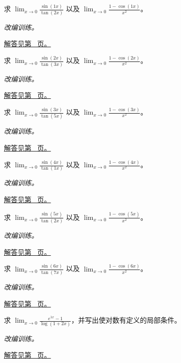 \documentclass[12pt,fontset=fandol]{ctexart}
\begin{document}
\begin{example}[三角函数的局部比较]\label{ex:c3q8}
求 $\displaystyle\lim_{x\to0}\frac{\sin(1x)}{\tan(2x)}$ 以及 $\displaystyle\lim_{x\to0}\frac{1-\cos(1x)}{x^2}$。
\par\textit{改编训练。}\par\hyperref[ans:c3q8]{解答见第~\pageref{ans:c3q8} 页。}
\end{example}
\begin{example}[三角函数的局部比较]\label{ex:c3q9}
求 $\displaystyle\lim_{x\to0}\frac{\sin(2x)}{\tan(3x)}$ 以及 $\displaystyle\lim_{x\to0}\frac{1-\cos(2x)}{x^2}$。
\par\textit{改编训练。}\par\hyperref[ans:c3q9]{解答见第~\pageref{ans:c3q9} 页。}
\end{example}
\begin{example}[三角函数的局部比较]\label{ex:c3q10}
求 $\displaystyle\lim_{x\to0}\frac{\sin(3x)}{\tan(5x)}$ 以及 $\displaystyle\lim_{x\to0}\frac{1-\cos(3x)}{x^2}$。
\par\textit{改编训练。}\par\hyperref[ans:c3q10]{解答见第~\pageref{ans:c3q10} 页。}
\end{example}
\begin{example}[三角函数的局部比较]\label{ex:c3q11}
求 $\displaystyle\lim_{x\to0}\frac{\sin(4x)}{\tan(1x)}$ 以及 $\displaystyle\lim_{x\to0}\frac{1-\cos(4x)}{x^2}$。
\par\textit{改编训练。}\par\hyperref[ans:c3q11]{解答见第~\pageref{ans:c3q11} 页。}
\end{example}
\begin{example}[三角函数的局部比较]\label{ex:c3q12}
求 $\displaystyle\lim_{x\to0}\frac{\sin(5x)}{\tan(2x)}$ 以及 $\displaystyle\lim_{x\to0}\frac{1-\cos(5x)}{x^2}$。
\par\textit{改编训练。}\par\hyperref[ans:c3q12]{解答见第~\pageref{ans:c3q12} 页。}
\end{example}
\begin{example}[三角函数的局部比较]\label{ex:c3q13}
求 $\displaystyle\lim_{x\to0}\frac{\sin(6x)}{\tan(7x)}$ 以及 $\displaystyle\lim_{x\to0}\frac{1-\cos(6x)}{x^2}$。
\par\textit{改编训练。}\par\hyperref[ans:c3q13]{解答见第~\pageref{ans:c3q13} 页。}
\end{example}
\begin{example}[对数与指数复合的极限]\label{ex:c3q14}
求 $\displaystyle\lim_{x\to0}\frac{e^{1x}-1}{\log(1+2x)}$，并写出使对数有定义的局部条件。
\par\textit{改编训练。}\par\hyperref[ans:c3q14]{解答见第~\pageref{ans:c3q14} 页。}
\end{example}
\end{document}
